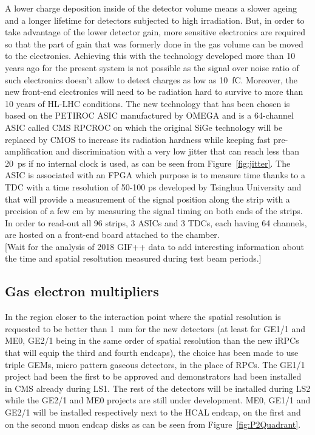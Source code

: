	A lower charge deposition inside of the detector volume means a slower ageing and a longer lifetime for detectors subjected to high irradiation. But, in order to take advantage of the lower detector gain, more sensitive electronics are required so that the part of gain that was formerly done in the gas volume can be moved to the electronics. Achieving this with the technology developed more than 10 years ago for the present system is not possible as the signal over noise ratio of such electronics doesn't allow to detect charges as low as \SI{10}{fC}. Moreover, the new front-end electronics will need to be radiation hard to survive to more than 10 years of HL-LHC conditions. The new technology that has been chosen is based on the PETIROC ASIC manufactured by OMEGA and is a 64-channel ASIC called CMS RPCROC on which the original SiGe technology will be replaced by CMOS to increase its radiation hardness while keeping fast pre-amplification and discrimination with a very low jitter that can reach less than \SI{20}{ps} if no internal clock is used, as can be seen from Figure~\ref{fig:jitter}. The ASIC is associated with an FPGA which purpose is to measure time thanks to a TDC with a time resolution of 50-100 \si{ps} developed by Tsinghua University and that will provide a measurement of the signal position along the strip with a precision of a few \si{cm} by measuring the signal timing on both ends of the strips. In order to read-out all 96 strips, 3 ASICs and 3 TDCs, each having 64 channels, are hosted on a front-end board attached to the chamber.\\
	
	{\color{blue}[Wait for the analysis of 2018 GIF++ data to add interesting information about the time and spatial resoltution measured during test beam periods.]\\}
	
	\subsection{Gas electron multipliers}
	\label{chapt3:ssec:GEMs}
	
	In the region closer to the interaction point where the spatial resolution is requested to be better than \SI{1}{mm} for the new detectors (at least for GE1/1 and ME0, GE2/1 being in the same order of spatial resolution than the new iRPCs that will equip the third and fourth endcaps), the choice has been made to use triple GEMs, micro pattern gaseous detectors, in the place of RPCs. The GE1/1 project had been the first to be approved and demonstrators had been installed in CMS already during LS1. The rest of the detectors will be installed during LS2 while the GE2/1 and ME0 projects are still under development. ME0, GE1/1 and GE2/1 will be installed respectively next to the HCAL endcap, on the first and on the second muon endcap disks as can be seen from Figure~\ref{fig:P2Quadrant}.
	
